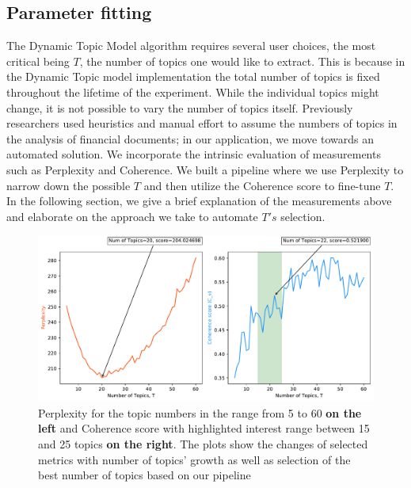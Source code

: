 \documentclass[12pt,journal,letterpaper,oneside,onecolumn]{IEEEtran}
\begin{document}
\subsection{Parameter fitting}
The Dynamic Topic Model algorithm requires several user choices, the most critical being $T$, the number of topics one would like to extract. 
This is because in the Dynamic Topic model implementation the total number of topics is fixed throughout the lifetime of the experiment. While the individual topics might change, it is not possible to vary the number of topics itself.
Previously researchers \cite{ref_Neuhierl_2013}\cite{ref_ratku_2016}\cite{evaluation_10k}  used heuristics and manual effort to assume the numbers of topics in the analysis of financial documents; in our application, we move towards an automated solution. We incorporate the intrinsic evaluation of measurements such as Perplexity and Coherence. We built a pipeline where we use Perplexity to narrow down the possible $T$ and then utilize the Coherence score to fine-tune $T$. In the following section, we give a brief explanation of the measurements above and elaborate on the approach we take to automate $T's$ selection.

\begin{figure}
    \centering
	\includegraphics[width=0.9\linewidth]{images/t_scan_combined_plot.pdf}
	\caption{Perplexity for the topic numbers in the range from 5 to 60 \textbf{on the left} and Coherence score with highlighted interest range between 15 and 25 topics \textbf{on the right}. The plots show the changes of selected metrics with number of topics' growth as well as selection of the best number of topics based on our pipeline}
	\label{fig:topic-num}       
\end{figure}
\end{document}
